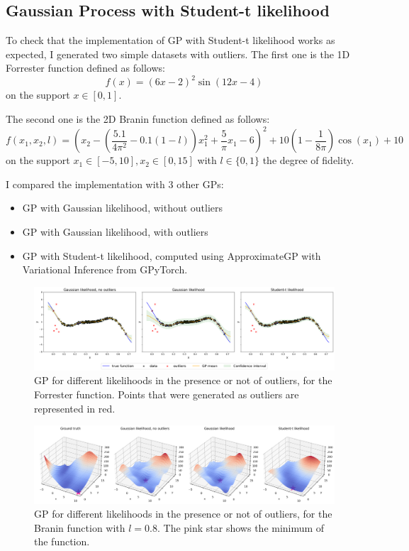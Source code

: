 \documentclass{article}
\begin{document}
\subsection{Gaussian Process with Student-t likelihood}

To check that the implementation of GP with Student-t likelihood works as expected, I generated two simple datasets with outliers. The first one is the 1D Forrester function defined as follows:
\begin{equation}
  \label{eq:forrester}
  f(x) = (6x - 2)^2 \sin(12x - 4)
\end{equation} on the support $x \in [0, 1]$.

The second one is the 2D Branin function defined as follows:
\begin{equation}
  \label{eq:branin}
  f(x_1, x_2, l) = \left(x_2 - \left( \frac{5.1}{4 \pi^2} - 0.1 (1 - l)\right)x_1^2 + \frac{5}{\pi} x_1 - 6 \right)^2 +
    10 (1 - \frac{1}{8 \pi}) \cos(x_1) + 10
\end{equation} on the support $x_1 \in [-5, 10], x_2 \in [0, 15]$ with $l \in \{0, 1\}$ the degree of fidelity.

I compared the implementation with 3 other GPs:
\begin{itemize}
  \item GP with Gaussian likelihood, without outliers
  \item GP with Gaussian likelihood, with outliers
  \item GP with Student-t likelihood, computed using \textrm{ApproximateGP} with Variational Inference from \textrm{GPyTorch}.
\end{itemize}

\begin{figure}[ht]
  \centering
  \includegraphics[width=\linewidth]{imgs/gp_1d.png}
  \caption{GP for different likelihoods in the presence or not of outliers, for the Forrester function. Points that were generated as outliers are represented in red.}
  \label{fig:gp_1d}
\end{figure}

\begin{figure}[ht]
  \centering
  \includegraphics[width=\linewidth]{imgs/gp_2d.png}
  \caption{GP for different likelihoods in the presence or not of outliers, for the Branin function with $l=0.8$. The pink star shows the minimum of the function.}
  \label{fig:gp_2d}
\end{figure}
\end{document}
